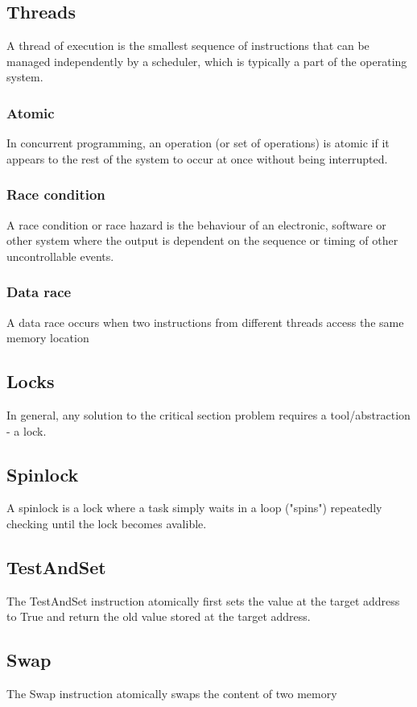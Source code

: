 \subsection{Threads}
A thread of execution is the smallest sequence of instructions
that can be managed independently by a scheduler, which is
typically a part of the operating system.

\subsubsection{Atomic}
In concurrent programming, an operation (or
set of operations) is atomic if it appears to the
rest of the system to occur at once without
being interrupted.

\subsubsection{Race condition}
A race condition or race hazard is the
behaviour of an electronic, software or other
system where the output is dependent on the
sequence or timing of other uncontrollable
events.

\subsubsection{Data race}
A data race occurs when two instructions from
different threads access the same memory location

\subsection{Locks}
In general, any solution to the
critical section problem requires a
tool/abstraction - a lock.

\subsection{Spinlock}
A spinlock is a lock where a task
simply waits in a loop ("spins")
repeatedly checking until the lock
becomes avalible.

\subsection{TestAndSet}
The TestAndSet instruction
atomically first sets the value at the
target address to True and return the
old value stored at the target address.

\subsection{Swap}
The Swap instruction atomically
swaps the content of two memory

